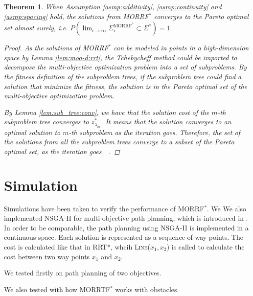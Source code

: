 \documentclass[conference]{IEEEtran}
\newtheorem{thm}{Theorem}
\begin{document}
\begin{thm}
\label{thm:morrt:conv}
When Assumption \ref{asmp:additivity}, \ref{asmp:continuity} and \ref{asmp:spacing} hold,
the solutions from MORRF$^{*} $ converges to the Pareto optimal set almost surely, i.e.
$
P( \lim_{ i \rightarrow \infty }  \Sigma^{\mbox{MORRF}^{*}}_{i}  \subset \Sigma^{*} ) = 1.
$
\begin{proof}
As the solutions of MORRF$^{*}$ can be modeled in points in a high-dimension space by Lemma \ref{lem:moo-d:rrt}, the Tchebycheff method could be imported to decompose the multi-objective optimization problem into a set of subproblems.
By the fitness definition of the subproblem trees, if the subproblem tree could find a solution that minimize the fitness, the solution is in the Pareto optimal set of the multi-objective optimization problem.

By Lemma \ref{lem:sub_tree:conv}, we have that the solution cost of the $ m $-th subproblem tree converges to $ z^{*}_{ \lambda_{m} } $.
It means that the solution converges to an optimal solution to $ m $-th subproblem as the iteration goes.
Therefore, the set of the solutions from all the subproblem trees converge to a subset of the Pareto optimal set, as the iteration goes~\cite{4358754}~\cite{miettinen1999nonlinear}.
\end{proof}
\end{thm}

\section{Simulation}
\label{sec:simulation}

Simulations have been taken to verify the performance of MORRF$^{*}$.
We 
We also implemented NSGA-II for multi-objective path planning, which is introduced in \cite{Ahmed2013}.
In order to be comparable, the path planning using NSGA-II is implemented in a continuous space.
Each solution is represented as a sequence of way points.
The cost is calculated like that in RRT*, whcih \textsc{Line}($ x_{1}, x_{2} $) is called to calculate the cost between two way points $ x_{1} $ and $ x_{2} $.


We tested firstly on path planning of two objectives.


We also tested with how MORRTF$^{*}$ works with obstacles.
\end{document}
